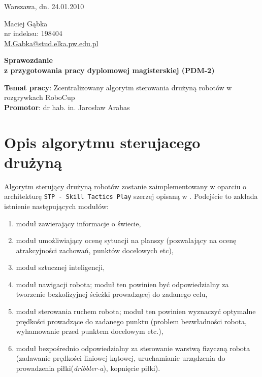 \documentclass[11pt,onecolumn,a4paper,final]{article}
\begin{document}
 

\begin{flushright}
	Warszawa, dn. 24.01.2010
\end{flushright}

\vspace{-1.45cm}

\begin{flushleft}
	Maciej Gąbka \\  nr indeksu: 198404 \\ \url{M.Gabka@stud.elka.pw.edu.pl}
\end{flushleft}

\vspace{0.5cm}

\begin{center}
	\LARGE \bfseries Sprawozdanie \\ z przygotowania pracy dyplomowej magisterskiej (PDM-2)
\end{center}

\vspace{1cm}

\begin{center}
\textbf{Temat pracy}: Zcentralizowany algorytm sterowania drużyną robotów w rozgrywkach RoboCup\\
\textbf{Promotor}: dr hab. in. Jarosław Arabas\
\end{center}

\section*{Opis algorytmu sterujacego drużyną}
Algorytm sterujący drużyną robotów zostanie zaimplementowany w oparciu o architekturę \mbox{\texttt{STP - Skill Tactics Play}} szerzej opisaną 
w \cite{stp}. Podejście to zakłada istnienie następujących modułów:
\begin{enumerate}
  \item moduł zawierający informacje o świecie,
  \item moduł umożliwiający ocenę sytuacji na planszy (pozwalający na ocenę atrakcyjności zachowań, punktów docelowych etc),
  \item moduł sztucznej inteligencji,
  \item moduł nawigacji robota; 
  moduł ten powinien być odpowiedzialny za tworzenie bezkolizyjnej ścieżki prowadzącej do zadanego celu,
  \item moduł sterowania ruchem robota;
  moduł ten powinien wyznaczyć optymalne prędkości prowadzące do zadanego punktu (problem bezwładności robota,
  wyhamowanie przed punktem docelowym etc.),
  \item moduł bezpośrednio odpowiedzialny za sterowanie warstwą fizyczną robota (zadawanie prędkości liniowej kątowej, uruchamianie urządzenia do prowadzenia 
  piłki(\textit{dribbler-a}), kopnięcie piłki).
\end{enumerate}
 
\end{document}
